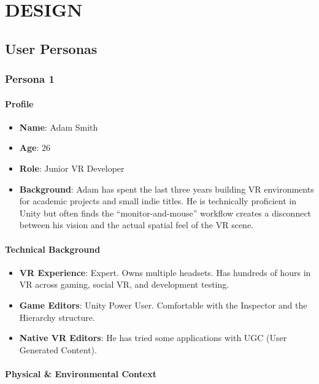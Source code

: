 \documentclass[inscr,ack,preface]{dithesis}
\begin{document}
\chapter{DESIGN}

\section{User Personas}

\subsection{Persona 1}

\subsubsection{Profile}

\begin{itemize}
  \item \textbf{Name}: Adam Smith
  \item \textbf{Age}: 26
  \item \textbf{Role}: Junior VR Developer
  \item \textbf{Background}: Adam has spent the last three years building VR environments
        for academic projects and small indie titles. He is technically proficient in Unity but often finds the
        ``monitor-and-mouse'' workflow creates a disconnect between his vision and the actual spatial feel of the VR scene.
\end{itemize}

\subsubsection{Technical Background}

\begin{itemize}
  \item \textbf{VR Experience}: Expert. Owns multiple headsets. Has hundreds of hours in VR across gaming, social VR, and development testing.
  \item \textbf{Game Editors}: Unity Power User. Comfortable with the Inspector and the Hierarchy structure.
  \item \textbf{Native VR Editors}: He has tried some applications with UGC (User Generated Content).
\end{itemize}

\subsubsection{Physical \& Environmental Context}
\end{document}
